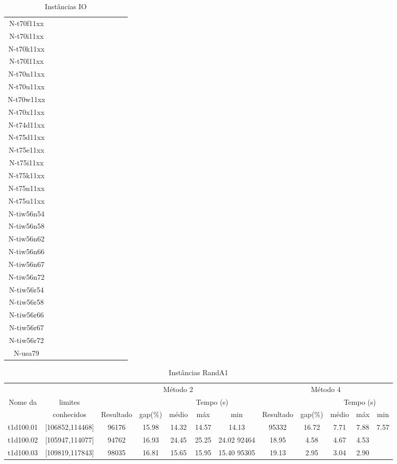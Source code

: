 \documentclass[a4paper,10pt,onecolumn]{article}
\begin{document}
\begin{table}[htbp]
\begin{tabular*}{\linewidth}{|c|c|ccccc|ccccc|}
    N-t70f11xx
\\
    N-t70i11xx
\\
    N-t70k11xx
\\
    N-t70l11xx
\\
    N-t70n11xx
\\
    N-t70u11xx
\\
    N-t70w11xx
\\
    N-t70x11xx
\\
    N-t74d11xx
\\
    N-t75d11xx
\\
    N-t75e11xx
\\
    N-t75i11xx
\\
    N-t75k11xx
\\
    N-t75n11xx
\\
    N-t75u11xx
\\
    N-tiw56n54
\\
    N-tiw56n58
\\
    N-tiw56n62
\\
    N-tiw56n66
\\
    N-tiw56n67
\\
    N-tiw56n72
\\
    N-tiw56r54
\\
    N-tiw56r58
\\
    N-tiw56r66
\\
    N-tiw56r67
\\
    N-tiw56r72
\\
    N-usa79
\\

\hline
  \end{tabular*}
  \caption{Instâncias IO}
\end{table}

\begin{table}[htbp]
  \noindent
  \footnotesize
  \centering
  \begin{tabular*}{\linewidth}{|c|c|ccccc|ccccc|}
    \hline 
    &  & 
    \multicolumn{5}{c|}{Método 2} &
    \multicolumn{5}{c|}{Método 4} \\
    Nome da & limites & 
    && \multicolumn{3}{c|}{Tempo (s)} &
    && \multicolumn{3}{c|}{Tempo (s)} \\
    &  conhecidos & 
    Resultado & gap(\%) & médio & máx & min &
    Resultado & gap(\%)  & médio & máx & min 
\\
    \hline
t1d100.01 & [106852,114468] &
96176 & 15.98 & 14.32   & 14.57  & 14.13 &
95332 & 16.72 & 7.71   & 7.88  & 7.57 \\
t1d100.02 & [105947,114077] &
94762 & 16.93 & 24.45   & 25.25  & 24.02
92464 & 18.95 & 4.58   & 4.67  & 4.53 \\
t1d100.03 & [109819,117843] &
98035 & 16.81 & 15.65   & 15.95  & 15.40
95305 & 19.13 & 2.95   & 3.04  & 2.90 \\
    \hline
  \end{tabular*}
  \caption{Instâncias RandA1}
\end{table}
\end{document}
